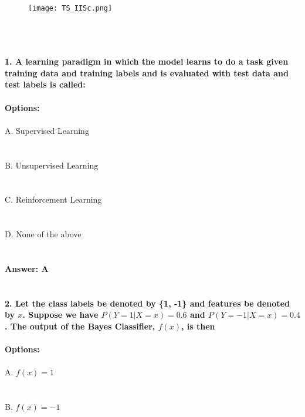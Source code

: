 \documentclass[prl,twocolumn,showpacs,preprintnumbers,superscriptaddress]{revtex4}
\theoremstyle{plain}
\theoremstyle{definition}
\begin{document}
\begin{widetext}
\\
\\
\\

\begin{wrapfigure}
\centering
\end{wrapfigure}
\begin{figure}[h!]
 \begin{right}
  \hfill\texttt{[image: TS\_IISc.png]}
 \end{right}
\end{figure}
\\
\\
\\
\noindent\textbf{1. A learning paradigm in which the model learns to do a task given training data and
training labels and is evaluated with test data and test labels is called:}
\\
\\
\textbf{Options:}
\\
\\
\noindent A. Supervised Learning
\\
\\
\\
B. Unsupervised Learning
\\
\\
\\
C. Reinforcement Learning
\\
\\
\\
D. None of the above
\\
\\
\\
\textbf{Answer: A}
\\
\\
\\
\noindent\textbf{2. Let the class labels be denoted by \{1, -1\} and features be denoted by $x$. Suppose we have $P(Y = 1| X = x) = 0.6$ and $P(Y = -1|X = x) = 0.4$. The output of the
Bayes Classifier, $f(x)$, is then}
\\
\\
\textbf{Options:}
\\
\\
\noindent A. $f(x) = 1$
\\
\\
\\
B. $f(x) = -1$
\\
\\

\end{widetext}
\end{document}
